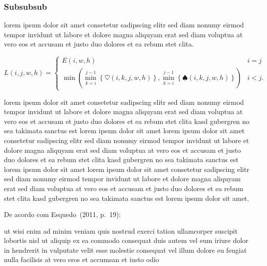 \subsubsection{Subsubsub}

lorem ipsum dolor sit amet consetetur sadipscing elitr sed diam nonumy
eirmod tempor invidunt ut labore et dolore magna aliquyam erat sed diam
voluptua at vero eos et accusam et justo duo dolores et ea rebum
stet clita.~\cite{GOLDENBERGAPL02}

\begin{equation}\label{eq:apl}%
    L\left(i,j,w,h\right)=
    \begin{cases}
      E\left(i,w,h\right) & i=j\\
      \min\left(\min_{k=i}^{j-1}\left\{\heartsuit\left(i,k,j,w,h\right)\right\},
                \min_{k=i}^{j-1}\left\{\spadesuit\left(i,k,j,w,h\right)\right\}\right) & i<j\text{.}
    \end{cases}
\end{equation}

lorem ipsum dolor sit amet consetetur sadipscing elitr sed diam nonumy
eirmod tempor invidunt ut labore et dolore magna aliquyam erat sed diam
voluptua at vero eos et accusam et justo duo dolores et ea rebum stet clita
kasd gubergren no sea takimata sanctus est lorem ipsum dolor sit amet lorem
ipsum dolor sit amet consetetur sadipscing elitr sed diam nonumy eirmod
tempor invidunt ut labore et dolore magna aliquyam erat sed diam voluptua at
vero eos et accusam et justo duo dolores et ea rebum stet clita kasd
gubergren no sea takimata sanctus est lorem ipsum dolor sit amet lorem ipsum
dolor sit amet consetetur sadipscing elitr sed diam nonumy eirmod tempor
invidunt ut labore et dolore magna aliquyam erat sed diam voluptua at vero
eos et accusam et justo duo dolores et ea rebum stet clita kasd gubergren no
sea takimata sanctus est lorem ipsum dolor sit amet.

%
De acordo com Esquedo~(2011, p.~19):

\begin{directcite}
ut wisi enim ad minim veniam quis nostrud exerci tation ullamcorper suscipit
lobortis nisl ut aliquip ex ea commodo consequat duis autem vel eum iriure
dolor in hendrerit in vulputate velit esse molestie consequat vel illum
dolore eu feugiat nulla facilisis at vero eros et accumsan et
iusto odio
\end{directcite}

